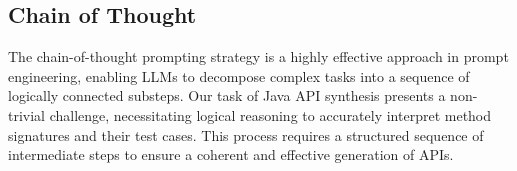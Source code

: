 

\subsection{Chain of Thought}
\label{sec:sec32}
The chain-of-thought prompting strategy is a highly effective approach in prompt engineering, enabling LLMs to decompose complex tasks into a sequence of logically connected substeps. Our task of Java API synthesis presents a non-trivial challenge, necessitating logical reasoning to accurately interpret method signatures and their test cases. This process requires a structured sequence of intermediate steps to ensure a coherent and effective generation of APIs.

